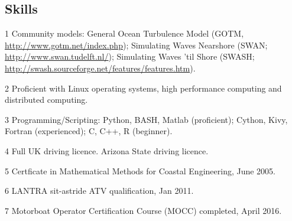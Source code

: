 \documentclass[margin,line]{resume}
\begin{document}
\begin{resume}
    \section{\mysidestyle Skills} 
    \begin{footnotesize}
    \begin{list1}
        \item[1] Community models: General Ocean Turbulence Model (GOTM, \url{http://www.gotm.net/index.php}); Simulating Waves Nearshore (SWAN; \url{http://www.swan.tudelft.nl/}); Simulating Waves 'til Shore (SWASH; \url{http://swash.sourceforge.net/features/features.htm}).\\
        \item[2] Proficient with Linux operating systems, high performance computing and distributed computing.\\
        \item[3] Programming/Scripting: Python, BASH, Matlab (proficient); Cython, Kivy, Fortran (experienced); C, C++, R (beginner).\\
        \item[4] Full UK driving licence. Arizona State driving licence.\\ 
        \item[5] Certficate in Mathematical Methods for Coastal Engineering, June 2005.\\
        \item[6] LANTRA sit-astride ATV qualification, Jan 2011.\\
        \item[7] Motorboat Operator Certification Course (MOCC) completed, April 2016.
    \end{list1}
     \end{footnotesize}


\end{resume}
\end{document}
